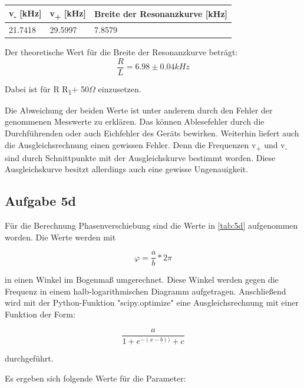 \documentclass[titlepage=firstcover, captions=tableheading]{scrartcl}
\begin{document}
\begin{center}
    \begin{tabular}{lll}
        \toprule
        v\textsubscript{-} [kHz]& v\textsubscript{+} [kHz] & Breite der Resonanzkurve [kHz]\\
        \midrule
        21.7418  & 29.5997 & 7.8579\\
        \bottomrule
    \end{tabular}
\end{center}

\noindent Der theoretische Wert für die Breite der Resonanzkurve beträgt:
\begin{displaymath}
    \frac{R}{L} = 6.98 \pm 0.04 kHz
\end{displaymath}

\noindent Dabei ist für R R\textsubscript{1}+ 50$\Omega$ einzusetzen.

\noindent Die Abweichung der beiden Werte ist unter anderem durch den Fehler der genommenen Messwerte zu erklären.
Das können Ablesefehler durch die Durchführenden oder auch Eichfehler des Geräts bewirken.
Weiterhin liefert auch die Ausgleichsrechnung einen gewissen Fehler.
Denn die Frequenzen v\textsubscript{+} und v\textsubscript{-} sind durch Schnittpunkte mit der Ausgleichskurve bestimmt worden.
Diese Ausgleichskurve besitzt allerdings auch eine gewisse Ungenauigkeit.

\subsection{Aufgabe 5d}

Für die Berechnung Phasenverschiebung sind die Werte in \ref{tab:5d} aufgenommen worden. 
Die Werte werden mit 

\begin{displaymath}
    \varphi = \frac{a}{b}*2\pi
\end{displaymath}

\noindent in einen Winkel im Bogenmaß umgerechnet.
Diese Winkel werden gegen die Frequenz in einem halb-logarithmischen Diagramm aufgetragen.
Anschließend wird mit der Python-Funktion "scipy.optimize" eine Ausgleichsrechnung mit einer Funktion der Form:

\begin{displaymath}
  \frac{a}{1 + e^{-(x - b))}+c}   
\end{displaymath}

\noindent durchgeführt.

\noindent Es ergeben sich folgende Werte für die Parameter:
\end{document}
